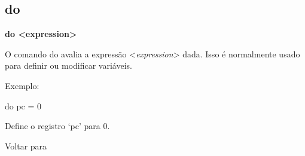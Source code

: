 \documentclass[letterpaper,10pt,brazil]{sphinxmanual}
\begin{document}
\subsection{do}
\label{debugger/general:do}\label{debugger/general:debugger-command-do}
\begin{DUlineblock}{0em}
\item[]
\begin{DUlineblock}{\DUlineblockindent}
\item[] \textbf{do \textless{}expression\textgreater{}}
\item[] 
\end{DUlineblock}
\item[] O comando do avalia a expressão \textless{}\emph{expression}\textgreater{} dada. Isso é normalmente usado para definir ou modificar variáveis.
\item[] 
\item[] Exemplo:
\item[] 
\item[]
\begin{DUlineblock}{\DUlineblockindent}
\item[] do pc = 0
\item[] 
\end{DUlineblock}
\item[] Define o registro `pc' para 0.
\item[] 
\item[] Voltar para {\hyperref[debugger/general:debugger\string-general\string-list]{}}
\end{DUlineblock}
\begin{quote}
\label{debugger/general:debugger-command-symlist}\end{quote}
\end{document}
